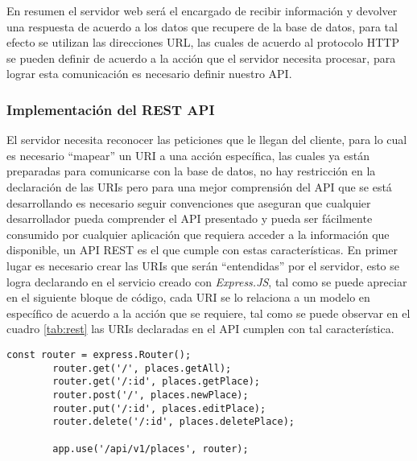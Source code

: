 En resumen el servidor web será el encargado de recibir información y devolver una respuesta de acuerdo a los datos que recupere de la base de datos, para tal efecto se utilizan las direcciones URL, las cuales de acuerdo al protocolo HTTP se pueden definir de acuerdo a la acción que el servidor necesita procesar, para lograr esta comunicación es necesario definir nuestro API.\\


\subsubsection{Implementación del REST API}
\label{subs:Implementacion del REST API}



El servidor necesita reconocer las peticiones que le llegan del cliente, para lo cual es necesario ``mapear'' un URI a una acción específica, las cuales ya están preparadas para comunicarse con la base de datos, no hay restricción en la declaración de las URIs pero para una mejor comprensión del API que se está desarrollando es necesario seguir convenciones que aseguran que cualquier desarrollador pueda comprender el API presentado y pueda ser fácilmente consumido por cualquier aplicación que requiera acceder a la información que disponible, un API REST es el que cumple con estas características.
En primer lugar es necesario crear las URIs que serán ``entendidas'' por el servidor, esto se logra declarando en el servicio creado con \emph{Express.JS}, tal como se puede apreciar en el siguiente bloque de código, cada URI se lo relaciona a un modelo en específico de acuerdo a la acción que se requiere, tal como se puede observar en el cuadro \ref{tab:rest} las URIs declaradas en el API cumplen con tal característica.\\


\begin{center}
  \begin{lstlisting}[label=express_api,caption=Declarando API REST con ExpressJS]
        const router = express.Router();
        router.get('/', places.getAll);
        router.get('/:id', places.getPlace);
        router.post('/', places.newPlace);
        router.put('/:id', places.editPlace);
        router.delete('/:id', places.deletePlace);

        app.use('/api/v1/places', router);
  \end{lstlisting}
\end{center}

